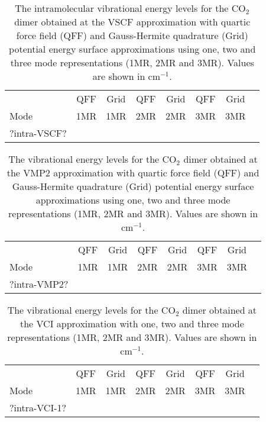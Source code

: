 \documentclass[aip,jcp,showpacs,superscriptaddress,groupedaddress]{revtex4-1}  %
\begin{document}
\begin{table}[H]
\caption{The intramolecular vibrational energy levels for the CO$_2$ dimer obtained at the VSCF approximation with quartic force field (QFF) and Gauss-Hermite quadrature (Grid) potential energy surface approximations using one, two and three mode representations (1MR, 2MR and 3MR). Values are shown in cm$^{-1}$.}
\begin{ruledtabular}
\begin{tabular}{lccccccc}
    & QFF &  Grid & QFF & Grid & QFF & Grid   \\  
  Mode & 1MR & 1MR & 2MR & 2MR & 3MR & 3MR   \\ 
\hline \Tstrut
?intra-VSCF?
\end{tabular}
\end{ruledtabular}
\label{table:intra-vscf}
\end{table}

\begin{table}[H]
\caption{The vibrational energy levels for the CO$_2$ dimer obtained at the VMP2 approximation with quartic force field (QFF) and Gauss-Hermite quadrature (Grid) potential energy surface approximations using one, two and three mode representations (1MR, 2MR and 3MR). Values are shown in cm$^{-1}$.}
\begin{ruledtabular}
\begin{tabular}{lccccccc}
    & QFF &  Grid & QFF & Grid & QFF & Grid   \\  
  Mode & 1MR & 1MR & 2MR & 2MR & 3MR & 3MR   \\ 
\hline \Tstrut
?intra-VMP2?
\end{tabular}
\end{ruledtabular}
\label{table:intra-vmp2}
\end{table}


\begin{table}[H]
\caption{The vibrational energy levels for the CO$_2$ dimer obtained at the VCI approximation with one, two and three mode representations (1MR, 2MR and 3MR). Values are shown in cm$^{-1}$.}
\begin{ruledtabular}
\begin{tabular}{lccccccc}
    & QFF &  Grid & QFF & Grid & QFF & Grid   \\  
  Mode & 1MR & 1MR & 2MR & 2MR & 3MR & 3MR   \\ 
\hline \Tstrut
?intra-VCI-1?
\end{tabular}
\end{ruledtabular}
\label{table:intra-vci-1}
\end{table}
\end{document}
